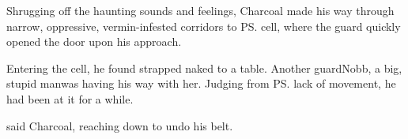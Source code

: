 \begin{garbage}
Shrugging off the haunting sounds and feelings, Charcoal made his way through narrow, oppressive, vermin-infested corridors to \ps{\Constance}{} cell, where the guard quickly opened the door upon his approach. 

Entering the cell, he found \Constance{} strapped naked to a table. 
Another guard\dash Nobb, a big, stupid man\dash was having his way with her. 
Judging from \ps{\Constance}{} lack of movement, he had been at it for a while. 

 said Charcoal, reaching down to undo his belt. 
 
\end{garbage}







